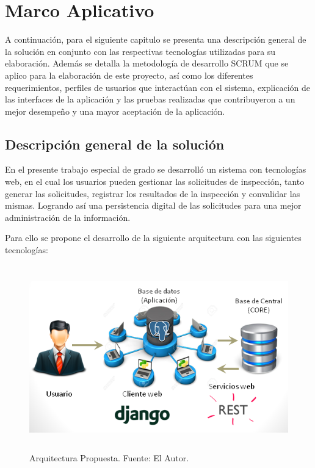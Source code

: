 \chapter{Marco Aplicativo}
\setlength{\parskip}{5mm}
A continuación, para el siguiente capitulo se presenta una descripción general de la solución en conjunto con las respectivas tecnologías utilizadas para su elaboración. Además se detalla la metodología de desarrollo SCRUM que se aplico para la elaboración de este proyecto, así como los diferentes requerimientos, perfiles de usuarios que interactúan con el sistema, explicación de las interfaces de la aplicación y las pruebas realizadas que contribuyeron a un mejor desempeño y una mayor aceptación de la aplicación. 

\setlength{\parskip}{0mm}

\section{Descripción general de la solución} 
\setlength{\parskip}{5mm}

En el presente trabajo especial de grado se desarrolló un sistema con tecnologías web, en el cual los usuarios pueden gestionar las solicitudes de inspección, tanto generar las solicitudes, registrar los resultados de la inspección y convalidar las mismas. Logrando así una persistencia digital de las solicitudes para una mejor administración de la información.

Para ello se propone el desarrollo de la siguiente arquitectura con las siguientes tecnologías:

\begin{figure}[H]
\begin{center}
	\includegraphics[width=15cm,height=8cm]{img/con_tecnologia1.png}
\end{center}
\caption{Arquitectura Propuesta. Fuente: El Autor.}
\label{fig:Con_Tec}
\end{figure}

